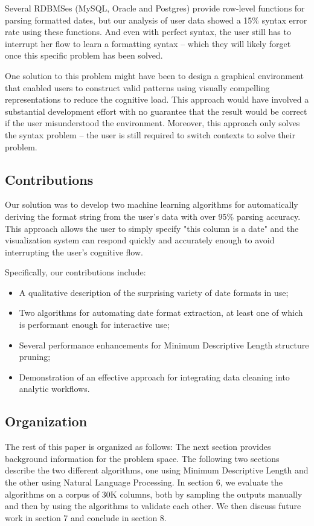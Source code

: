 Several RDBMSes (\eg MySQL, Oracle and Postgres) provide row-level functions for parsing formatted dates, but our analysis of user data showed a 15\% syntax error rate using these functions. And even with perfect syntax, the user still has to interrupt her flow to learn a formatting syntax -- which they will likely forget once this specific problem has been solved.

One solution to this problem might have been to design a graphical environment that enabled users to construct valid patterns using visually compelling representations to reduce the cognitive load. This approach would have involved a substantial development effort with no guarantee that the result would be correct if the user misunderstood the environment. Moreover, this approach only solves the syntax problem -- the user is still required to switch contexts to solve their problem.

\subsection{Contributions}
Our solution was to develop two machine learning algorithms for automatically deriving the format string from the user's data with over 95\% parsing accuracy. This approach allows the user to simply specify "this column is a date" and the visualization system can respond quickly and accurately enough to avoid interrupting the user's cognitive flow.

Specifically, our contributions include:

\begin{itemize}
\item A qualitative description of the surprising variety of date formats in use;
\item Two algorithms for automating date format extraction, at least one of which is performant enough for interactive use;
\item Several performance enhancements for Minimum Descriptive Length structure pruning;
\item Demonstration of an effective approach for integrating data cleaning into analytic workflows.
\end{itemize}

\subsection{Organization}
The rest of this paper is organized as follows: The next section provides background information for the problem space. The following two sections describe the two different algorithms, one using Minimum Descriptive Length and the other using Natural Language Processing. In section 6, we evaluate the algorithms on a corpus of 30K columns, both by sampling the outputs manually and then by using the algorithms to validate each other. We then discuss future work in section 7 and conclude in section 8.
